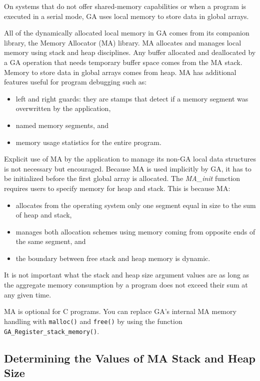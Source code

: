 On systems that do not offer shared-memory capabilities or when a program is
executed in a serial mode, GA uses local memory to store data in global arrays.

All of the dynamically allocated local memory in GA comes from its companion
library, the Memory Allocator (MA) library. MA allocates and manages local
memory using stack and heap disciplines. Any buffer allocated and deallocated
by a GA operation that needs temporary buffer space comes from the MA stack.
Memory to store data in global arrays comes from heap. MA has additional
features useful for program debugging such as:
\begin{itemize}
\item left and right guards: they are stamps that detect if a memory segment
was overwritten by the application, 
\item named memory segments, and 
\item memory usage statistics for the entire program.
\end{itemize}
Explicit use of MA by the application to manage its non-GA local data
structures is not necessary but encouraged. Because MA is used implicitly by
GA, it has to be initialized before the first global array is allocated.  The
\emph{MA\_init} function requires users to specify memory for heap and stack.
This is because MA:
\begin{itemize}
\item allocates from the operating system only one segment equal in size to the
sum of heap and stack, 
\item manages both allocation schemes using memory coming from opposite ends of
the same segment, and 
\item the boundary between free stack and heap memory is dynamic.
\end{itemize}
It is not important what the stack and heap size argument values are
as long as the aggregate memory consumption by a program does not
exceed their sum at any given time. 

MA is optional for C programs. You can replace GA's internal MA memory handling
with \texttt{malloc()} and \texttt{free()} by using the function
\texttt{GA\_Register\_stack\_memory()}.


\subsection{Determining the Values of MA Stack and Heap Size}

